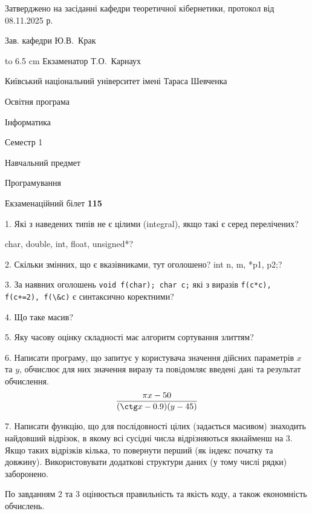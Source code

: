 \documentclass[12pt, ukrainian]{article}
\def\code#1{\Verb!#1!}
\begin{document}
{\smallskip\smallskip \begin {scriptsize} Затверджено на засіданні кафедри теоретичної кібернетики, протокол   від   08.11.2025 р.\par\smallskip\smallskip\smallskip\smallskip
{\parbox {6.5 cm} {Зав. кафедри \dotfill Ю.В.~Крак}}\hspace {0.7cm} {\hbox to 6.5 cm { Екзаменатор \dotfill Т.О.~Карнаух}} \end{scriptsize}}
\newpage
{{\begin {scriptsize}\par
{ \center  Київський національний університет імені Тараса Шевченка \par}
{\parbox {5 cm}{Освітня програма \hfill}{\parbox {7 cm}{Інформатика\hfill}}\parbox {6 cm}{\hfill Семестр 1}}\par
{\parbox {5 cm} {Навчальний предмет \hfill}\parbox {7 cm}{Програмування \hfill}\parbox {6cm}{\hfill}\par}\vspace{-15pt} \end{scriptsize}}{\center Екзаменаційний білет \No \textbf { 115 }\par}}
{%
1. Які з наведених типів не є цілими (integral), якщо такі є серед перелічених?

char, double, int, float, unsigned*?
\par
\vspace{2mm}
2. Скільки змінних, що є вказівниками, тут оголошено?
int n, m, *p1, p2;?
\par
\vspace{2mm}
3. За наявних оголошень \code{void f(char); char c;} які з виразів \code{f(c*c), f(c+=2), f(\&c)} є синтаксично коректними?
\par
\vspace{2mm}
4. Що таке масив?
\par
\vspace{2mm}
5. Яку часову оцінку складності має алгоритм сортування злиттям?
\par
\vspace{2mm}
6. Написати програму, що запитує у користувача значення дійсних параметрів $x$ та $y$, обчислює для них значення виразу та повiдомляє введенi данi та результат обчислення.
$$\frac{\pi x - 50}{(\ctg x - 0.9) (y - 45)}$$ 

\par
7. Написати функцію, що для послідовності цілих (задається масивом) знаходить найдовший відрізок, в якому всі сусідні числа відрізняються якнайменш на 3. Якщо таких відрізків кілька, то повернути перший (як індекс початку та довжину). Використовувати додаткові структури даних (у тому числі рядки) заборонено.

По завданням 2 та 3 оцінюється правильність та якість коду, а також економність обчислень.

}
\end{document}
